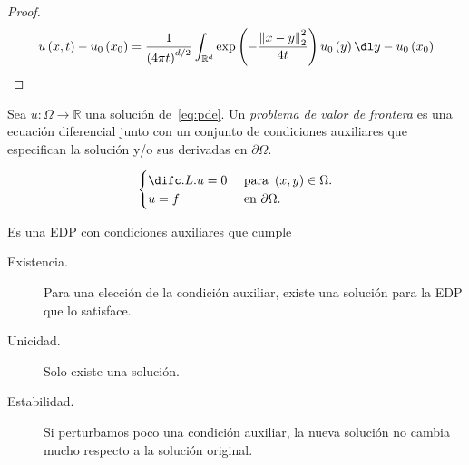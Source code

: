 \begin{proof}
    \begin{equation*}
        u\left(x,t\right)-
        u_{0}\left(x_{0}\right)=
        \dfrac{1}{{\left(4\pi t\right)}^{d/2}}
        \int_{\mathbb{R}^{d}}
        \exp\left(-\dfrac{{\left\|x-y\right\|}^{2}_{2}}{4t}\right)
        u_{0}\left(y\right)\dl y-
        u_{0}\left(x_{0}\right)
    \end{equation*}
\end{proof}

\begin{definition}
    Sea
    \begin{math}
        u\colon
        \Omega
        \to\mathbb{R}
    \end{math}
    una solución de~\eqref{eq:pde}.
    Un \emph{problema de valor de frontera} es una ecuación
    diferencial junto con un conjunto de condiciones auxiliares que
    especifican la solución y/o sus derivadas en $\partial\Omega$.
\end{definition}

\begin{example}
    \begin{equation*}
        \begin{cases}
            \difc.L.{u}{}=0
             & \text{ para }
            \left(x,y\right)\in\Omega. \\
            u=f
             & \text{ en }
            \partial\Omega.
        \end{cases}
    \end{equation*}
\end{example}

\begin{definition}
    Es una EDP con condiciones auxiliares que cumple
    \begin{description}
        \item[Existencia.]

              Para una elección de la condición auxiliar, existe
              una solución para la EDP que lo satisface.

        \item[Unicidad.]

              Solo existe una solución.

        \item[Estabilidad.]

              Si perturbamos poco una condición auxiliar, la nueva
              solución no cambia mucho respecto a la solución original.
    \end{description}
\end{definition}

